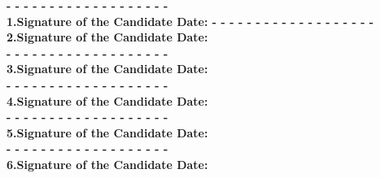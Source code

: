 \documentclass[a4paper,12pt]{article}
\begin{document}
\textbf{
\- - - - - - - - - - - - - - - - - - - - \\
1.Signature of the Candidate \newline 
Date: \newline
\vspace{1cm}\newline
\- - - - - - - - - - - - - - - - - - - - \\
2.Signature of the Candidate \newline
Date: \newline \\
\vspace{1cm}\newline
\- - - - - - - - - - - - - - - - - - - - \\
3.Signature of the Candidate \newline
Date: \newline \\
\vspace{1cm}\newline
\- - - - - - - - - - - - - - - - - - - - \\
4.Signature of the Candidate \newline
Date: \newline \\
\vspace{1cm}\newline
\- - - - - - - - - - - - - - - - - - - - \\
5.Signature of the Candidate \newline
Date: \newline \\
\vspace{1cm}\newline
\- - - - - - - - - - - - - - - - - - - - \\
6.Signature of the Candidate \newline
Date: \newline \\
}
\newpage
\end{document}
